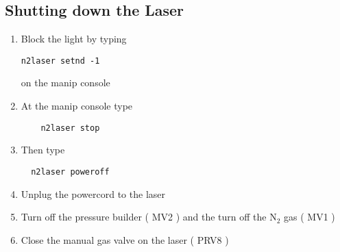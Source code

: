\subsection{Shutting down the Laser}  
\begin{enumerate}
\item Block the light by typing 
\begin{verbatim}
n2laser setnd -1
\end{verbatim}
on the manip console
\item At the manip console type 
 \begin{verbatim}
    n2laser stop
 \end{verbatim}
\item Then type
\begin{verbatim}
  n2laser poweroff
\end{verbatim}
\item Unplug the powercord to the laser 
\item Turn off the pressure builder ( MV2 ) and the turn off the N$_2$ gas ( MV1 )
\item Close the manual gas valve on the laser ( PRV8 )
\end{enumerate}
  

